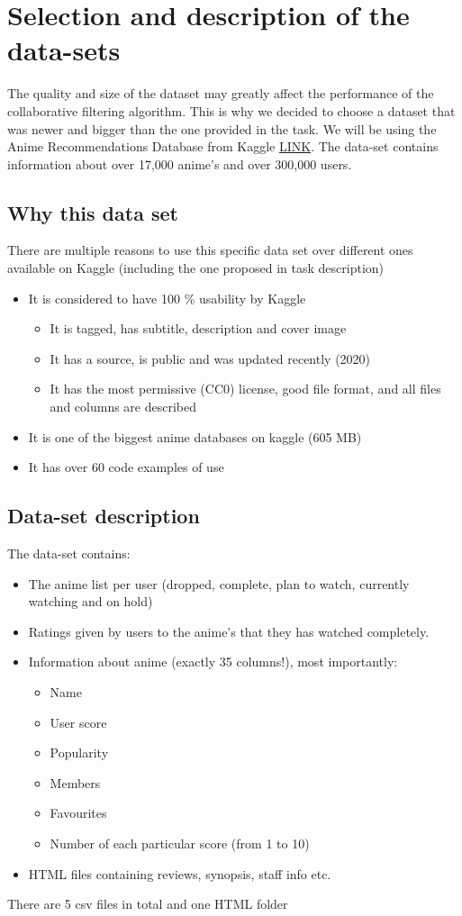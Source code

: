 \section{Selection and description of the data-sets}
The quality and size of the dataset may greatly affect the performance of the collaborative filtering algorithm. This is why we decided to choose a dataset that was newer and bigger than the one provided in the task.
We will be using the Anime Recommendations Database from Kaggle \href{https://www.kaggle.com/datasets/hernan4444/anime-recommendation-database-2020}{LINK}. The data-set contains information about over 17,000 anime's and over 300,000 users. \\ 
\subsection{Why this data set}
There are multiple reasons to use this specific data set over different ones available on Kaggle (including the one proposed in task description) \\ 
\begin{itemize}
\item It is considered to have 100 \% usability by Kaggle
\begin{itemize}
\item It is tagged, has subtitle, description and cover image
\item It has a source, is public and was updated recently (2020)
\item It has the most permissive (CC0) license, good file format, and all files and columns are described
\end{itemize}
\item It is one of the biggest anime databases on kaggle (605 MB)
\item It has over 60 code examples of use
\end{itemize}
\subsection{Data-set description}

The data-set contains: 
\begin{itemize}
    \item The anime list per user (dropped, complete, plan to watch, currently watching and on hold)
    \item Ratings given by users to the anime's that they has watched completely.
    \item Information about anime (exactly 35 columns!), most importantly: 
    \begin{itemize}
        \item Name
        \item User score 
        \item Popularity
        \item Members
        \item Favourites
        \item Number of each particular score (from 1 to 10)
    \end{itemize}
    \item HTML files containing reviews, synopsis, staff info etc.
\end{itemize}
There are 5 csv files in total and one HTML folder 

